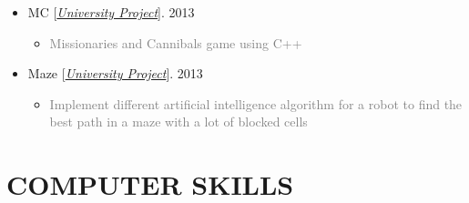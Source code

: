 \documentclass[10pt,a4paper,sans]{moderncv} %
\begin{document}
\begin{itemize}
		\item MC [\href{https://sbu.ac.ir/Cols/CSE/Pages/default.aspx/}{\emph{University Project}}]. \hfill 2013
		\begin{itemize}
			\item \textcolor{gray} {Missionaries and Cannibals game using C++}
		\end{itemize}

		\item Maze [\href{https://sbu.ac.ir/Cols/CSE/Pages/default.aspx/}{\emph{University Project}}]. \hfill 2013
		\begin{itemize}
			\item \textcolor{gray} {Implement different artificial intelligence algorithm for a robot to find the best path in a maze with a lot of blocked cells}
		\end{itemize}


	\end{itemize}
	
	\section{COMPUTER SKILLS}
	
\end{document}
